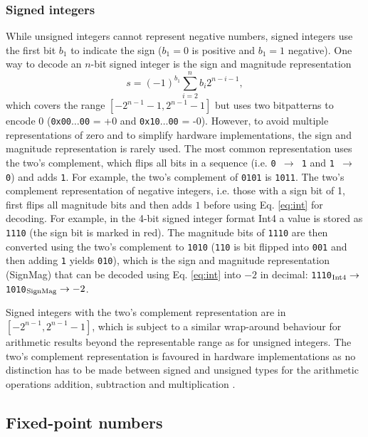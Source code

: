 \subsubsection{Signed integers}
\label{sec:int}

While unsigned integers cannot represent negative numbers, signed integers use the first bit $b_1$ to indicate the sign ($b_1 = 0$ is
positive and $b_1 = 1$ negative). One way to decode an $n$-bit signed integer is the sign and magnitude representation
\begin{equation}
	s = (-1)^{b_1}\sum_{i=2}^{n} b_i 2^{n-i-1},
	\label{eq:int}
\end{equation}
which covers the range $[-2^{n-1}-1,2^{n-1}-1]$ but uses two bitpatterns to encode 0 (\texttt{0x00$\dots$00} = +0 and \texttt{0x10$\dots$00} = -0).
However, to avoid multiple representations of zero and to simplify hardware implementations, the sign and magnitude representation
is rarely used. The most common representation uses the two's complement, which flips all bits in a sequence (i.e. \texttt{0 $\to$ 1} and \texttt{1 $\to$ 0})
and adds \texttt{1}. For example, the two's complement of \texttt{0101} is \texttt{1011}. The two's complement representation of negative
integers, i.e. those with a sign bit of 1, first flips all magnitude bits and then adds $1$ before using Eq. \ref{eq:int} for decoding. For example,
in the 4-bit signed integer format Int4 a value is stored as \texttt{{\color{psign}1}110} (the sign bit is marked in red). The magnitude bits of
\texttt{{\color{psign}1}110} are then converted using the two's complement to \texttt{{\color{psign}1}010} (\texttt{110} is bit flipped into \texttt{001}
and then adding \texttt{1} yields \texttt{010}), which is the sign and magnitude representation (SignMag) that can be decoded using Eq. \ref{eq:int}
into $-2$ in decimal: \texttt{{\color{psign}1}110}$_{\operatorname{Int4}} \to$ \texttt{{\color{psign}1}010}$_{\operatorname{SignMag}} \to -2$. 

Signed integers with the two's complement representation are in $[-2^{n-1},2^{n-1}-1]$, which is subject to a similar wrap-around behaviour 
for arithmetic results beyond the representable range as for unsigned integers. The two's complement representation
is favoured in hardware implementations as no distinction has to be made between signed and unsigned types for the
arithmetic operations addition, subtraction and multiplication \citep{Choo2003}.

\subsection{Fixed-point numbers}
\label{sec:fixpoints}

